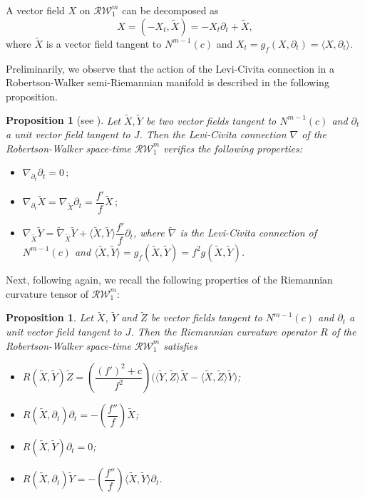 \documentclass[11pt]{amsart}
\theoremstyle{plain}
\newtheorem{proposition}  [theorem]  {Proposition}
\theoremstyle{definition}
\numberwithin{equation}{section}
\begin{document}
A vector field $X$ on $\mathcal{RW}^{m}_1$ can be decomposed as
\[
X =  (-X_t,\widetilde{X}) = - X_t \partial_t + \widetilde{X} ,
\]
where $\widetilde{X}$ is a vector field tangent to $N^{m-1}(c)$ and $X_t =g_f(X,\partial_t)= \langle X, \partial_t\rangle$.

Preliminarily, we observe that the action of the Levi-Civita connection in a Robertson-Walker semi-Riemannian manifold is described in the following proposition.

\begin{proposition}[see \cite{Neill}]\label{connection-Robertson-Walker-tangent}
Let $\widetilde{X}, \widetilde{Y}$ be two vector fields tangent to $N^{m-1}(c)$ and $ \partial_t$ a unit vector field tangent to $J$. Then the Levi-Civita connection $\nabla$ of the Robertson-Walker space-time $\mathcal{RW}^{m}_1$ verifies the following properties:
\begin{itemize}
\item[(i)] $\nabla_{\partial_t} \partial_t = 0 \,;$
\item[(ii)] $\nabla_{\partial_t} \widetilde{X} = \nabla_{\widetilde{X}} \partial_t = \dfrac{f'}{f} \widetilde{X}\,;$
\item[(iii)] $\nabla_{\widetilde{X}} \widetilde{Y} = \widetilde{\nabla}_{\widetilde{X}} \widetilde{Y} + \langle \widetilde{X}, \widetilde{Y} \rangle \dfrac{f'}{f} \partial_t$, where $\widetilde{\nabla}$ is the Levi-Civita connection of $N^{m-1}(c)$ and $\langle \widetilde{X}, \widetilde{Y} \rangle=g_f(\widetilde{X},\widetilde{Y})=f^2 g(\widetilde{X},\widetilde{Y})$.
\end{itemize}
\end{proposition}
Next, following \cite{Neill} again, we recall the following properties of the Riemannian curvature tensor of $\mathcal{RW}^{m}_1$:
\begin{proposition}\label{tensor-curvature-Robertson-Walker-tangent}
Let $\widetilde{X}$, $\widetilde{Y}$ and $\widetilde{Z}$ be vector fields tangent to $N^{m-1}(c)$ and $\partial_t$ a unit vector field tangent to $J$. Then the Riemannian curvature operator $R$ of the Robertson-Walker space-time $\mathcal{RW}^{m}_1$ satisfies 
\begin{itemize}
\item[(i)] $R(\widetilde{X}, \widetilde{Y}) \widetilde{Z} = \left( \dfrac{(f')^2 + c}{f^2} \right)\big( \langle \widetilde{Y}, \widetilde{Z}\rangle \widetilde{X}  - \langle \widetilde{X}, \widetilde{Z}\rangle \widetilde{Y} \big)$;
\item[(ii)] $R(\widetilde{X}, \partial_t) \partial_t  = - \left( \dfrac{f''}{f} \right) \widetilde{X}$;
\item[(iii)] $R(\widetilde{X}, \widetilde{Y}) \partial_t = 0$;
\item[(iv)] $R(\widetilde{X}, \partial_t) \widetilde{Y} = - \left( \dfrac{f''}{f} \right) \langle \widetilde{X}, \widetilde{Y}\rangle \partial_t$.
\end{itemize}
\end{proposition}
\end{document}
